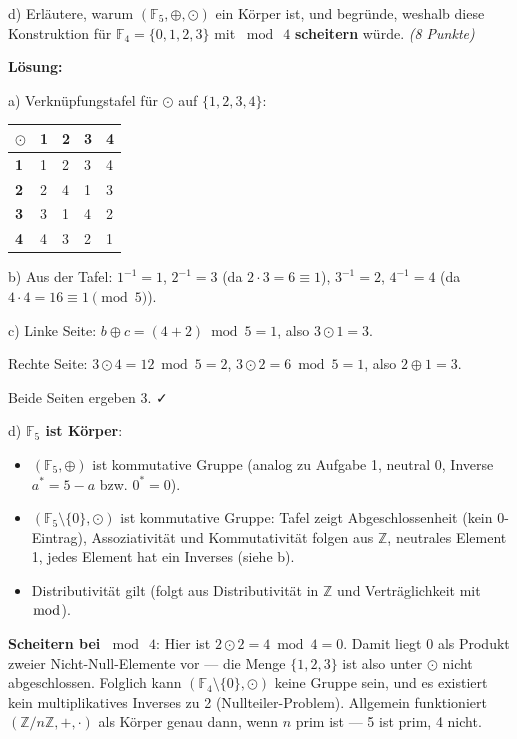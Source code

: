 \documentclass[11pt, a4paper]{article}
\begin{document}
d) Erläutere, warum $(\mathbb{F}_5, \oplus, \odot)$ ein Körper ist, und begründe, weshalb diese Konstruktion für $\mathbb{F}_4 = \{0,1,2,3\}$ mit $\bmod\ 4$ \textbf{scheitern} würde. \textit{(8 Punkte)}


\textbf{Lösung:}


a) Verknüpfungstafel für $\odot$ auf $\{1,2,3,4\}$:



{\small
\begin{tabularx}{\linewidth}{XXXXX}
\hline
\rowcolor{tableheadbg}
{\color{white}\textbf{$\odot$}} & {\color{white}\textbf{1}} & {\color{white}\textbf{2}} & {\color{white}\textbf{3}} & {\color{white}\textbf{4}} \\[2pt]
\hline
\endhead
\hline
\endfoot
\textbf{1} & 1 & 2 & 3 & 4 \\
\textbf{2} & 2 & 4 & 1 & 3 \\
\textbf{3} & 3 & 1 & 4 & 2 \\
\textbf{4} & 4 & 3 & 2 & 1 \\
\end{tabularx}
}


b) Aus der Tafel: $1^{-1}=1$, $2^{-1}=3$ (da $2\cdot 3 = 6 \equiv 1$), $3^{-1}=2$, $4^{-1}=4$ (da $4 \cdot 4 = 16 \equiv 1 \pmod 5$).


c) Linke Seite: $b \oplus c = (4+2) \bmod 5 = 1$, also $3 \odot 1 = 3$.

Rechte Seite: $3 \odot 4 = 12 \bmod 5 = 2$, $3 \odot 2 = 6 \bmod 5 = 1$, also $2 \oplus 1 = 3$.

Beide Seiten ergeben 3. ✓


d) \textbf{$\mathbb{F}_5$ ist Körper}:

\begin{itemize}
  \item $(\mathbb{F}_5, \oplus)$ ist kommutative Gruppe (analog zu Aufgabe 1, neutral 0, Inverse $a^* = 5-a$ bzw. $0^*=0$).
  \item $(\mathbb{F}_5 \setminus \{0\}, \odot)$ ist kommutative Gruppe: Tafel zeigt Abgeschlossenheit (kein 0-Eintrag), Assoziativität und Kommutativität folgen aus $\mathbb{Z}$, neutrales Element 1, jedes Element hat ein Inverses (siehe b).
  \item Distributivität gilt (folgt aus Distributivität in $\mathbb{Z}$ und Verträglichkeit mit $\bmod$).
\end{itemize}

\textbf{Scheitern bei $\bmod\ 4$}: Hier ist $2 \odot 2 = 4 \bmod 4 = 0$. Damit liegt 0 als Produkt zweier Nicht-Null-Elemente vor — die Menge $\{1,2,3\}$ ist also unter $\odot$ nicht abgeschlossen. Folglich kann $(\mathbb{F}_4 \setminus \{0\}, \odot)$ keine Gruppe sein, und es existiert kein multiplikatives Inverses zu 2 (Nullteiler-Problem). Allgemein funktioniert $(\mathbb{Z}/n\mathbb{Z}, +, \cdot)$ als Körper genau dann, wenn $n$ prim ist — 5 ist prim, 4 nicht.
\end{document}
